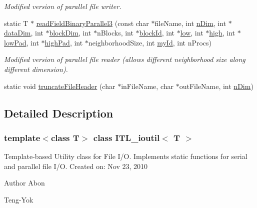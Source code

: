 \begin{DoxyCompactItemize}
\begin{DoxyCompactList}\small\item\em Modified version of parallel file writer. \item\end{DoxyCompactList}\item 
static T $\ast$ \hyperlink{classITL__ioutil_a5d591988598d12ecaa2d35bbb60134f4}{readFieldBinaryParallel3} (const char $\ast$fileName, int \hyperlink{MainIT__regvector_8cpp_a49f80c85e94dab34e43eefa8569b847a}{nDim}, int $\ast$\hyperlink{MainIT__regvector_8cpp_a1b6b235a26917090521e783da84ef326}{dataDim}, int $\ast$\hyperlink{MainIT__regvector_8cpp_a3d5a7fab820f74511d7978e3611ae905}{blockDim}, int $\ast$nBlocks, int $\ast$\hyperlink{MainIT__regvector_8cpp_a3b0be19f729a7cb8162d1f92e1f650fb}{blockId}, int $\ast$\hyperlink{MainIT__regvector_8cpp_abb1e2dad97264e859f3ee8af1341d68c}{low}, int $\ast$\hyperlink{MainIT__regvector_8cpp_a2012a18ba7a98e566c072356d03c4240}{high}, int $\ast$\hyperlink{MainIT__regvector_8cpp_a4f25631e4cedb3a6318d8a9166ab454d}{lowPad}, int $\ast$\hyperlink{MainIT__regvector_8cpp_a41c49039cbd24b06ac2adf735b8e8bdf}{highPad}, int $\ast$neighborhoodSize, int \hyperlink{MainIT__regvector_8cpp_a556290f6728d2e8721669d530981a077}{myId}, int nProcs)
\begin{DoxyCompactList}\small\item\em Modified version of parallel file reader (allows different neighborhood size along different dimension). \item\end{DoxyCompactList}\item 
static void \hyperlink{classITL__ioutil_a26e23f265abc129fc517b80197f07893}{truncateFileHeader} (char $\ast$inFileName, char $\ast$outFileName, int \hyperlink{MainIT__regvector_8cpp_a49f80c85e94dab34e43eefa8569b847a}{nDim})
\end{DoxyCompactItemize}


\subsection{Detailed Description}
\subsubsection*{template$<$class T$>$ class ITL\_\-ioutil$<$ T $>$}

Template-\/based Utility class for File I/O. Implements static functions for serial and parallel file I/O. Created on: Nov 23, 2010 \begin{DoxyAuthor}{Author}
Abon 

Teng-\/Yok 
\end{DoxyAuthor}



